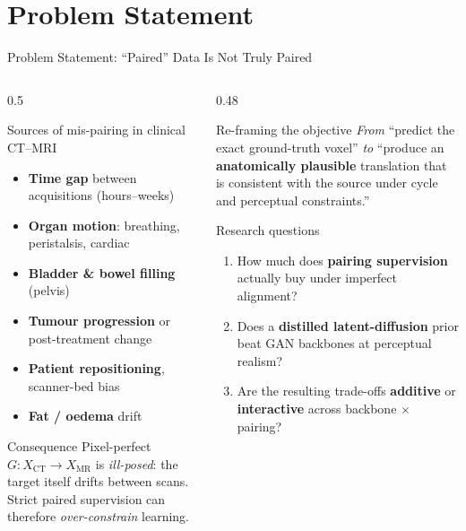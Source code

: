 \documentclass[aspectratio=169,10pt]{beamer}
\begin{document}
\section{Problem Statement}
\begin{frame}{Problem Statement: ``Paired'' Data Is Not Truly Paired}
\begin{columns}[T]
\begin{column}{0.5\textwidth}
\begin{alertblock}{Sources of mis-pairing in clinical CT--MRI}
\footnotesize
\begin{itemize}
    \item \textbf{Time gap} between acquisitions (hours--weeks)
    \item \textbf{Organ motion}: breathing, peristalsis, cardiac
    \item \textbf{Bladder \& bowel filling} (pelvis)
    \item \textbf{Tumour progression} or post-treatment change
    \item \textbf{Patient repositioning}, scanner-bed bias
    \item \textbf{Fat / oedema} drift
\end{itemize}
\end{alertblock}
\begin{block}{Consequence}
\footnotesize
Pixel-perfect $G:X_{\text{CT}}\!\to\! X_{\text{MR}}$ is \emph{ill-posed}: the target itself drifts between scans.
Strict paired supervision can therefore \emph{over-constrain} learning.
\end{block}
\end{column}
\begin{column}{0.48\textwidth}
\begin{exampleblock}{Re-framing the objective}
\footnotesize
\textit{From} ``predict the exact ground-truth voxel''
\textit{to} ``produce an \textbf{anatomically plausible} translation that is consistent with the source under cycle and perceptual constraints.''
\end{exampleblock}
\begin{block}{Research questions}
\footnotesize
\begin{enumerate}
    \item How much does \textbf{pairing supervision} actually buy under imperfect alignment?
    \item Does a \textbf{distilled latent-diffusion} prior beat GAN backbones at perceptual realism?
    \item Are the resulting trade-offs \textbf{additive} or \textbf{interactive} across backbone $\times$ pairing?
\end{enumerate}
\end{block}
\end{column}
\end{columns}
\end{frame}
\end{document}
